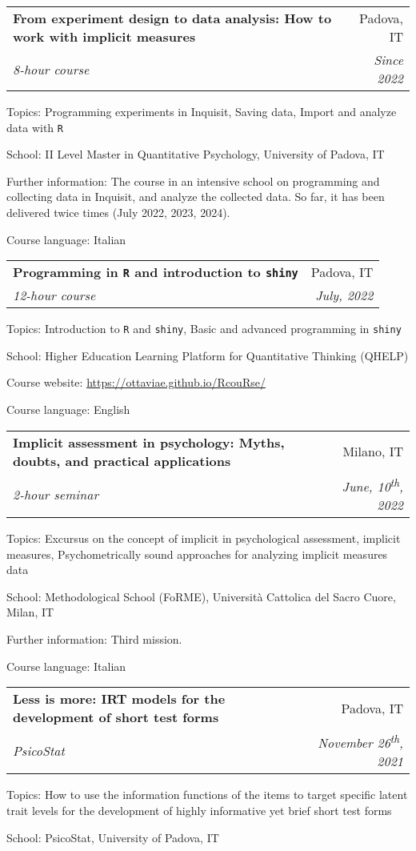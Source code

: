 \documentclass[letterpaper,12pt]{article}
\makeatletter
\newcommand{\resumeSubheading}[4]{
  \vspace{-1pt}\item
    \begin{tabular*}{0.97\textwidth}{l@{\extracolsep{\fill}}r}
      \textbf{#1} & #2 \\
      \textit{\small#3} & \textit{\small #4} \\
    \end{tabular*}\vspace{-5pt}
}
\makeatother
\begin{document}
\resumeSubheading {From experiment design to data analysis: How to work with implicit measures}{Padova, IT}{8-hour course}{Since 2022}

{\small Topics: Programming experiments in Inquisit, Saving data, Import and analyze data with \texttt{R}}

{\small School: II Level Master in Quantitative Psychology, University of Padova, IT} 

{\small Further information: The course in an intensive school on programming and collecting data in Inquisit, and analyze the collected data. So far, it has been delivered twice times (July 2022, 2023, 2024). } 

{\small Course language: Italian}


\resumeSubheading {Programming in \texttt{R} and introduction to \texttt{shiny}}{Padova, IT}{12-hour course}{July, 2022}

{\small Topics: Introduction to \texttt{R} and \texttt{shiny}, Basic and advanced programming in \texttt{shiny}} 

{\small School: Higher Education
	Learning Platform for Quantitative Thinking (QHELP)} 
	
{\small Course website: \href{https://ottaviae.github.io/RcouRse/}{https://ottaviae.github.io/RcouRse/}}

{\small Course language: English}

\resumeSubheading {Implicit assessment in psychology: Myths, doubts, and practical applications}{Milano, IT}{2-hour seminar}{June, 10\textsuperscript{th}, 2022}

{\small Topics: Excursus on the concept of implicit in psychological assessment, implicit measures, Psychometrically sound approaches for analyzing implicit measures data} 

{\small School: Methodological School (FoRME), Università Cattolica del Sacro Cuore, Milan, IT} 

{\small Further information: Third mission.  } 

{\small Course language: Italian}

\resumeSubheading {Less is more: IRT models for the development of short test forms}{Padova, IT}{PsicoStat}{November 26\textsuperscript{th}, 2021}


{\small Topics: How to use the information functions of the items to target specific latent trait levels for the development of highly informative yet brief short test forms} 

{\small School: PsicoStat, University of Padova, IT} 
\end{document}
